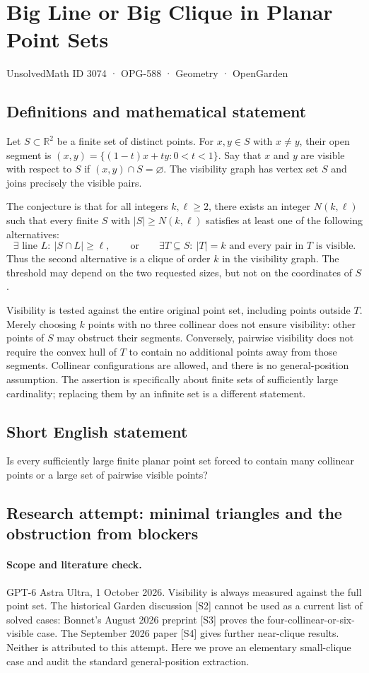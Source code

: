 \documentclass[11pt,a4paper]{article}
\begin{document}
\section*{Big Line or Big Clique in Planar Point Sets}\label{3074}
{\small UnsolvedMath ID 3074 · OPG-588 · Geometry · OpenGarden}
\subsection{Definitions and mathematical statement}
Let $S\subset\mathbb R^2$ be a finite set of distinct points. For
$x,y\in S$ with $x\ne y$, their open segment is
$(x,y)=\{(1-t)x+ty:0<t<1\}$. Say that $x$ and $y$ are visible with
respect to $S$ if $(x,y)\cap S=\varnothing$. The visibility graph has
vertex set $S$ and joins precisely the visible pairs.

The conjecture is that for all integers $k,\ell\ge2$, there exists an
integer $N(k,\ell)$ such that every finite $S$ with $|S|\ge N(k,\ell)$
satisfies at least one of the following alternatives:
\[
 \exists\text{ line }L:\ |S\cap L|\ge\ell,
 \qquad\text{or}\qquad
 \exists T\subseteq S:\ |T|=k\text{ and every pair in }T\text{ is visible}.
\]
Thus the second alternative is a clique of order $k$ in the visibility
graph. The threshold may depend on the two requested sizes, but not on
the coordinates of $S$.

Visibility is tested against the entire original point set, including
points outside $T$. Merely choosing $k$ points with no three collinear
does not ensure visibility: other points of $S$ may obstruct their
segments. Conversely, pairwise visibility does not require the convex hull
of $T$ to contain no additional points away from those segments.
Collinear configurations are allowed, and there is no general-position
assumption. The assertion is specifically about finite sets of sufficiently
large cardinality; replacing them by an infinite set is a different statement.
\subsection{Short English statement}
Is every sufficiently large finite planar point set forced to contain many collinear points or a large set of pairwise visible points?
\subsection{Research attempt: minimal triangles and the obstruction from blockers}
\paragraph{Scope and literature check.}
GPT-6 Astra Ultra, 1 October 2026. Visibility is always measured
against the full point set. The historical Garden discussion [S2]
cannot be used as a current list of solved cases: Bonnet's August
2026 preprint [S3] proves the four-collinear-or-six-visible case.
The September 2026 paper [S4] gives further near-clique results.
Neither is attributed to this attempt. Here we prove an elementary
small-clique case and audit the standard general-position extraction.
\end{document}
